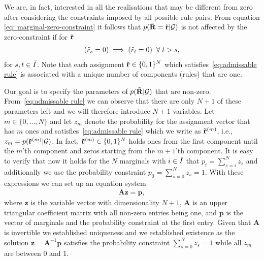 \documentclass{article}
\theoremstyle{plain}
\theoremstyle{remark}
\newcommand{\vecallrules}{\mathbf{\Tilde{r}}}
\newcommand{\randomvecallrules}{\mathbf{\Tilde{R}}}
\newcommand{\oneruleassignment}{\Tilde{r}}
\newcommand{\alltriples}{\mathcal{G}}
\newcommand{\indexSetAll}{\Tilde{I}}
\begin{document}
\noindent We are, in fact, interested in all the realisations that may be different from zero after considering the constraints imposed by all possible rule pairs. From equation \eqref{eq: marginal-zero-constraint} it follows that $p(\Tilde{\mathbf{R}} = \vecallrules | \alltriples)$ is not affected by the zero-constraint if for $\vecallrules$
\begin{align}
    (\oneruleassignment_s = 0) \implies (\oneruleassignment_t = 0) \;\; \forall \; t > s , \label{eq:admissable rule}
\end{align}
for $s,t \in \indexSetAll$. Note that each assignment $\vecallrules \in \{0, 1\}^N$ which satisfies~\eqref{eq:admissable rule} is associated with a unique number of components (rules) that are one.



Our goal is to specify the parameters of $p(\randomvecallrules | \alltriples)$ that are non-zero. From~\eqref{eq:admissable rule} we can observe that there are only $N+1$ of these parameters left and we will therefore introduce $N+1$ variables. Let $m \in \{0,...,N\}$ and let $z_m$ denote the probability for the assignment vector that has $m$ ones and satisfies~\eqref{eq:admissable rule} which we write as $\vecallrules^{(m)}$, i.e., $z_m = p({\vecallrules^{(m)}} | \alltriples)$. In fact, $\vecallrules^{(m)} \in \{0, 1\}^N$ holds ones from the first component until the $m$'th component and zeros starting from the $m+1$'th component. It is easy to verify that now it holds for the $N$ marginals with $i \in \indexSetAll$ that $p_i = \sum_{s=i}^{N}z_s$ and additionally we use the probability constraint $p_0 =  \sum_{s=0}^{N}z_s = 1$. With these expressions we can set up an equation system
\begin{align}
    \mathbf{A} \mathbf{z} = \mathbf{p} \label{eq:system},
\end{align}
where $\mathbf{z}$ is the variable vector with dimensionality $N+1$, $\mathbf{A}$ is an upper triangular coefficient matrix with all non-zero entries being one, and $\mathbf{p}$ is the vector of marginals and the probability constraint at the first entry. Given that $\mathbf{A}$ is invertible we established uniqueness and we established existence as the solution $\mathbf{z} = \mathbf{A}^{-1}\mathbf{p}$ satisfies the probability constraint $\sum_{s=0}^{N}z_s = 1$ while all $z_m$ are between 0 and 1. 
\end{document}
